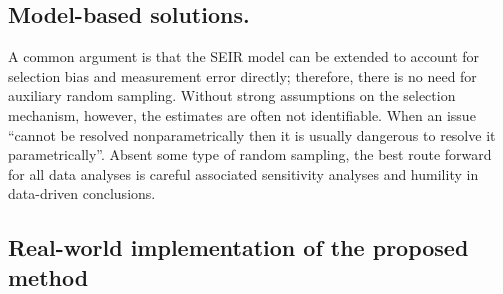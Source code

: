 \documentclass[11pt]{amsart}
\numberwithin{equation}{section}
\theoremstyle{plain}
\begin{document}


 \subsection*{Model-based solutions.}

 A common argument is that the SEIR model can be extended to account for selection bias and measurement error directly; therefore, there is no need for auxiliary random sampling.  Without strong assumptions on the selection mechanism, however, the estimates are often not identifiable.  When an issue ``cannot be resolved nonparametrically then it is usually dangerous to resolve it parametrically''\citep{CoxHink74}. Absent some type of random sampling, the best route forward for all data analyses is careful associated sensitivity analyses and humility in data-driven conclusions.  


 \subsection*{Real-world implementation of the proposed method}
\end{document}

